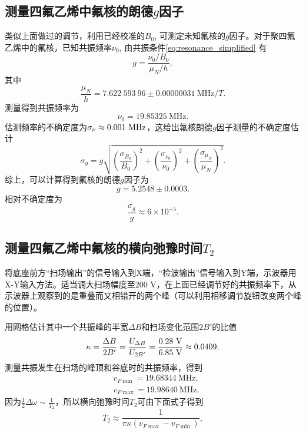\documentclass[font=default]{mpltx}
\begin{document}
\subsection{测量四氟乙烯中氟核的朗德$g$因子}
类似上面做过的调节，利用已经校准的$B_0$, 可测定未知氟核的$g$因子。对于聚四氟乙烯中的氟核，已知共振频率$\nu_0$, 由共振条件\autoref{eq:resonance_simplified} 有\begin{equation}g = \frac{\nu_0/B_0}{\mu_N/h},\end{equation} 其中
\begin{equation}
  \frac{\mu_N}{h}=7.622\ 593\ 96\pm\SI{ 0.00000031}{\MHz/T}.
\end{equation}
测量得到共振频率为
\begin{equation}
  \nu_0 = \SI{19.85325}{\MHz}.
\end{equation}
估测频率的不确定度为$\sigma_{\nu}\approx 0.001\ {\rm MHz}$，这给出氟核朗德$g$因子测量的不确定度估计
\begin{equation}
  \sigma_{g} = g\sqrt{\left(\frac{\sigma_{B_0}}{B_0}\right)^2+\left(\frac{\sigma_{\nu_0}}{\nu_0}\right)^2+\left(\frac{\sigma_{\mu_N}}{\mu_N}\right)^2}.
\end{equation}
综上，可以计算得到氟核的朗德$g$因子为
\begin{equation}
  g = \num{5.2548}\pm\num{0.0003}.
\end{equation}
相对不确定度为
\begin{equation}
  \frac{\sigma_{g}}{g}\approx6\times10^{-5}.
\end{equation}
\subsection{测量四氟乙烯中氟核的横向弛豫时间$T_2$}
将底座前方“扫场输出”的信号输入到X端，“检波输出”信号输入到Y端，示波器用X-Y输入方法。适当调大扫场幅度至200 V，在上面已经调节好的共振频率下，从示波器上观察到的是重叠而又相错开的两个峰（可以利用相移调节旋钮改变两个峰的位置）。

用网格估计其中一个共振峰的半宽$\Delta B$和扫场变化范围$2B'$的比值
	\begin{equation}
		\kappa =\frac{\Delta B}{2B'}=\frac{U_{\Delta B}}{U_{2B'}} = \frac{0.28\ {\rm V}}{6.85\ {\rm V}}\approx 0.0409.
	\end{equation}
测量共振发生在扫场的峰顶和谷底时的共振频率，得到\begin{equation}
  \begin{aligned}
    &v_{F\min}=\SI{19.68344}{\MHz},\\
    &v_{F\max}=\SI{19.98640}{\MHz}.
  \end{aligned}
\end{equation}
因为$\frac12\Delta\omega\sim\frac{1}{T_2}$，所以横向弛豫时间$T_2$可由下面式子得到
\begin{equation}
  T_2\approx\frac{1}{\pi\kappa(v_{F\max}-v_{F\min})},
\end{equation}
\end{document}
